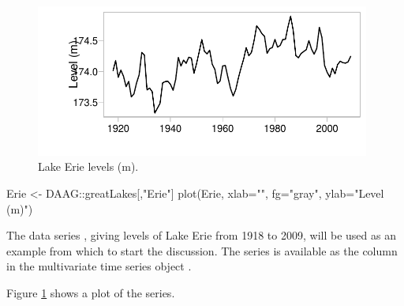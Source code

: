 \begin{figure}
\begin{Schunk}


\centerline{\includegraphics[width=0.98\textwidth]{figs/9-Erie1-1} }

\end{Schunk}
\caption{Lake Erie levels (m).
}\label{fig:erie}
\end{figure}
\begin{marginfigure}[-7cm]
\begin{Schunk}
\begin{Sinput}
Erie <- DAAG::greatLakes[,"Erie"]
plot(Erie, xlab="", fg="gray",
     ylab="Level (m)")
\end{Sinput}
\end{Schunk}
\end{marginfigure}

The data series , giving levels of Lake Erie
from 1918 to 2009, will be used as an example from which
to start the discussion.
    The series is available as the column  in the
    multivariate time series object .

Figure \ref{fig:erie} shows a plot of the series.

